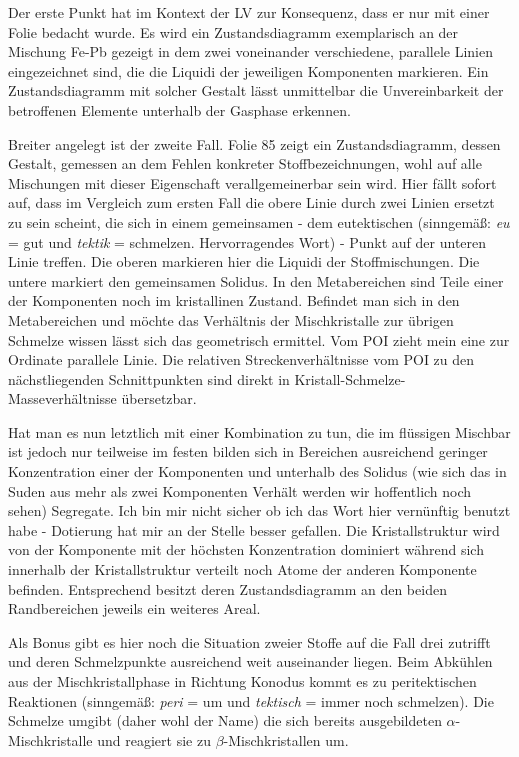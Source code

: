 Der erste Punkt hat im Kontext der LV zur Konsequenz, dass er nur mit einer Folie bedacht wurde. Es wird
ein Zustandsdiagramm exemplarisch an der Mischung Fe-Pb gezeigt in dem zwei voneinander verschiedene,
parallele Linien eingezeichnet sind, die die Liquidi der jeweiligen Komponenten markieren. Ein
Zustandsdiagramm mit solcher Gestalt lässt unmittelbar die Unvereinbarkeit der betroffenen Elemente
unterhalb der Gasphase erkennen.\par
Breiter angelegt ist der zweite Fall. Folie 85 zeigt ein Zustandsdiagramm, dessen Gestalt, gemessen an
dem Fehlen konkreter Stoffbezeichnungen, wohl auf alle Mischungen mit dieser Eigenschaft verallgemeinerbar
sein wird. Hier fällt sofort auf, dass im Vergleich zum ersten Fall die obere Linie durch zwei Linien
ersetzt zu sein scheint, die sich in einem gemeinsamen - dem eutektischen (sinngemäß: \textit{eu} = gut und \textit{tektik} = schmelzen. Hervorragendes Wort) - Punkt
auf der unteren Linie treffen. Die oberen markieren hier die Liquidi der Stoffmischungen. Die untere markiert
den gemeinsamen Solidus. In den Metabereichen sind Teile einer der Komponenten noch im kristallinen Zustand.
Befindet man sich in den Metabereichen und möchte das Verhältnis der Mischkristalle zur übrigen Schmelze
wissen lässt sich das geometrisch ermittel. Vom POI zieht mein eine zur Ordinate parallele Linie. Die
relativen Streckenverhältnisse vom POI zu den nächstliegenden Schnittpunkten sind direkt in
Kristall-Schmelze-Masseverhältnisse übersetzbar.\par
Hat man es nun letztlich mit einer Kombination zu tun, die im flüssigen Mischbar ist jedoch nur teilweise
im festen bilden sich in Bereichen ausreichend geringer Konzentration einer der Komponenten und unterhalb des Solidus
(wie sich das in Suden aus mehr als zwei Komponenten Verhält werden wir hoffentlich noch sehen) Segregate.
Ich bin mir nicht sicher ob ich das Wort hier vernünftig benutzt habe - Dotierung hat mir an der Stelle besser
gefallen. Die Kristallstruktur wird von der Komponente mit der höchsten Konzentration dominiert während sich
innerhalb der Kristallstruktur verteilt noch Atome der anderen Komponente befinden. Entsprechend besitzt deren
Zustandsdiagramm an den beiden Randbereichen jeweils ein weiteres Areal.\par
Als Bonus gibt es hier noch die Situation zweier Stoffe auf die Fall drei zutrifft und deren Schmelzpunkte
ausreichend weit auseinander liegen. Beim Abkühlen aus der Mischkristallphase in Richtung Konodus kommt es
zu peritektischen Reaktionen (sinngemäß: \textit{peri} = um und \textit{tektisch} = immer noch schmelzen).
Die Schmelze umgibt (daher wohl der Name) die sich bereits ausgebildeten \(\alpha\)-Mischkristalle und reagiert sie
zu \(\beta\)-Mischkristallen um.\par\medskip

